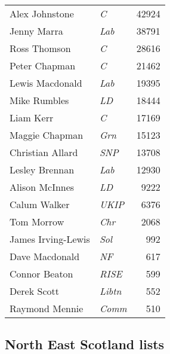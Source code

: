 {\footnotesize
\begin{tabular*}{\columnwidth}{@{\extracolsep{\fill}} p{} >{\itshape}l r @{\extracolsep{\fill}}}
	Alex Johnstone & C & 42924\\%
	Jenny Marra & Lab & 38791\\%
	Ross Thomson & C & 28616\\%
	Peter Chapman & C & 21462\\%
	Lewis Macdonald & Lab & 19395\\%
	Mike Rumbles & LD & 18444\\%
	Liam Kerr & C & 17169\\%
	\hline
	Maggie Chapman & Grn & 15123\\%
	Christian Allard & SNP & 13708\\%
	Lesley Brennan & Lab & 12930\\%
	Alison McInnes & LD & 9222\\%
	Calum Walker & UKIP & 6376\\%
	Tom Morrow & Chr & 2068\\%
	James Irving-Lewis & Sol & 992\\%
	Dave Macdonald & NF & 617\\%
	Connor Beaton & RISE & 599\\%
	Derek Scott & Libtn & 552\\%
	Raymond Mennie & Comm & 510\\%
\end{tabular*}

}

\subsection*{North East Scotland lists}

